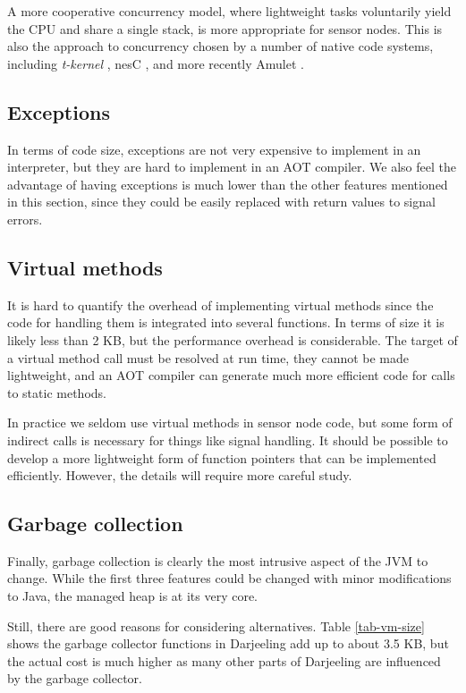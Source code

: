 A more cooperative concurrency model, where lightweight tasks voluntarily yield the CPU and share a single stack, is more appropriate for sensor nodes. This is also the approach to concurrency chosen by a number of native code systems, including \emph{t-kernel} \cite{Gu:2005un}, nesC \cite{Gay:2003up}, and more recently Amulet \cite{Hester:2016je}.


\subsection{Exceptions}
In terms of code size, exceptions are not very expensive to implement in an interpreter, but they are hard to implement in an AOT compiler. We also feel the advantage of having exceptions is much lower than the other features mentioned in this section, since they could be easily replaced with return values to signal errors.


\subsection{Virtual methods}
It is hard to quantify the overhead of implementing virtual methods since the code for handling them is integrated into several functions. In terms of size it is likely less than 2 KB, but the performance overhead is considerable. The target of a virtual method call must be resolved at run time, they cannot be made lightweight, and an AOT compiler can generate much more efficient code for calls to static methods.

In practice we seldom use virtual methods in sensor node code, but some form of indirect calls is necessary for things like signal handling. It should be possible to develop a more lightweight form of function pointers that can be implemented efficiently. However, the details will require more careful study.


\subsection{Garbage collection}
Finally, garbage collection is clearly the most intrusive aspect of the JVM to change. While the first three features could be changed with minor modifications to Java, the managed heap is at its very core.

Still, there are good reasons for considering alternatives. Table \ref{tab-vm-size} shows the garbage collector functions in Darjeeling add up to about 3.5 KB, but the actual cost is much higher as many other parts of Darjeeling are influenced by the garbage collector.


